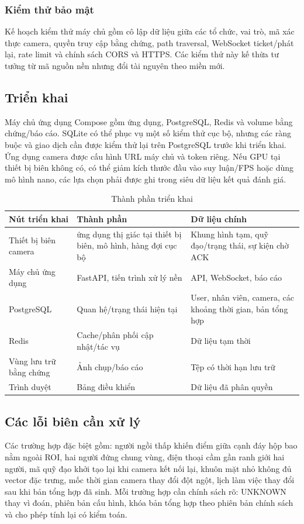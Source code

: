 \subsubsection{Kiểm thử bảo mật}
Kế hoạch kiểm thử máy chủ gồm cô lập dữ liệu giữa các tổ chức, vai trò, mã xác thực camera, quyền truy cập bằng chứng, path traversal, WebSocket ticket/phát lại, rate limit và chính sách CORS và HTTPS. Các kiểm thử này kế thừa tư tưởng từ mã nguồn nền nhưng đổi tài nguyên theo miền mới.

\subsection{Triển khai}
Máy chủ ứng dụng Compose gồm ứng dụng, PostgreSQL, Redis và volume bằng chứng/báo cáo. SQLite có thể phục vụ một số kiểm thử cục bộ, nhưng các ràng buộc và giao dịch cần được kiểm thử lại trên PostgreSQL trước khi triển khai. Ứng dụng camera được cấu hình URL máy chủ và token riêng. Nếu GPU tại thiết bị biên không có, có thể giảm kích thước đầu vào suy luận/FPS hoặc dùng mô hình nano, các lựa chọn phải được ghi trong siêu dữ liệu kết quả đánh giá.

\begin{table}[H]
\centering
\caption{Thành phần triển khai}
\label{tab:deployment}
\begin{tabularx}{\textwidth}{p{3.2cm}p{4cm}X}
\toprule
\textbf{Nút triển khai} & \textbf{Thành phần} & \textbf{Dữ liệu chính}\\
\midrule
Thiết bị biên camera & ứng dụng thị giác tại thiết bị biên, mô hình, hàng đợi cục bộ & Khung hình tạm, quỹ đạo/trạng thái, sự kiện chờ ACK\\
Máy chủ ứng dụng & FastAPI, tiến trình xử lý nền & API, WebSocket, báo cáo\\
PostgreSQL & Quan hệ/trạng thái hiện tại & User, nhân viên, camera, các khoảng thời gian, bản tổng hợp\\
Redis & Cache/phân phối cập nhật/tác vụ & Dữ liệu tạm thời\\
Vùng lưu trữ bằng chứng & Ảnh chụp/báo cáo & Tệp có thời hạn lưu trữ\\
Trình duyệt & Bảng điều khiển & Dữ liệu đã phân quyền\\
\bottomrule
\end{tabularx}
\end{table}

\subsection{Các lỗi biên cần xử lý}
Các trường hợp đặc biệt gồm: người ngồi thấp khiến điểm giữa cạnh đáy hộp bao nằm ngoài ROI, hai người đứng chung vùng, điện thoại cầm gần ranh giới hai người, mã quỹ đạo khởi tạo lại khi camera kết nối lại, khuôn mặt nhỏ không đủ vector đặc trưng, mốc thời gian camera thay đổi đột ngột, lịch làm việc thay đổi sau khi bản tổng hợp đã sinh. Mỗi trường hợp cần chính sách rõ: UNKNOWN thay vì đoán, phiên bản cấu hình, khóa bản tổng hợp theo phiên bản chính sách và cho phép tính lại có kiểm toán.

